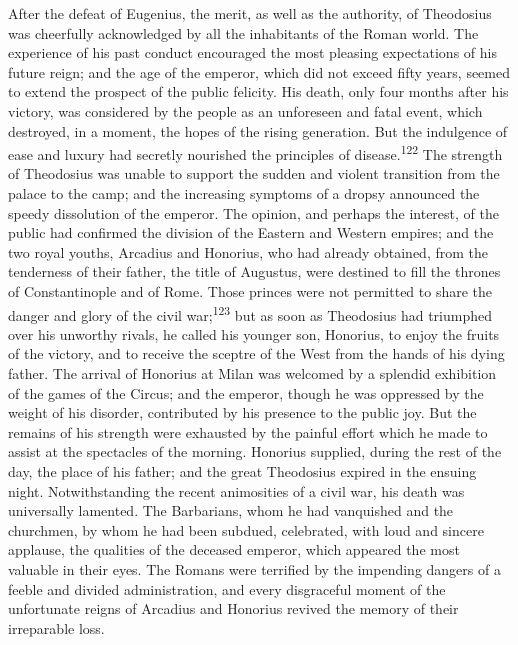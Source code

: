 
After the defeat of Eugenius, the merit, as well as the
authority, of Theodosius was cheerfully acknowledged by all the
inhabitants of the Roman world. The experience of his past
conduct encouraged the most pleasing expectations of his future
reign; and the age of the emperor, which did not exceed fifty
years, seemed to extend the prospect of the public felicity. His
death, only four months after his victory, was considered by the
people as an unforeseen and fatal event, which destroyed, in a
moment, the hopes of the rising generation. But the indulgence of
ease and luxury had secretly nourished the principles of disease.\textsuperscript{122}
The strength of Theodosius was unable to support the sudden
and violent transition from the palace to the camp; and the
increasing symptoms of a dropsy announced the speedy dissolution
of the emperor. The opinion, and perhaps the interest, of the
public had confirmed the division of the Eastern and Western
empires; and the two royal youths, Arcadius and Honorius, who had
already obtained, from the tenderness of their father, the title
of Augustus, were destined to fill the thrones of Constantinople
and of Rome. Those princes were not permitted to share the danger
and glory of the civil war;\textsuperscript{123} but as soon as Theodosius had
triumphed over his unworthy rivals, he called his younger son,
Honorius, to enjoy the fruits of the victory, and to receive the
sceptre of the West from the hands of his dying father. The
arrival of Honorius at Milan was welcomed by a splendid
exhibition of the games of the Circus; and the emperor, though he
was oppressed by the weight of his disorder, contributed by his
presence to the public joy. But the remains of his strength were
exhausted by the painful effort which he made to assist at the
spectacles of the morning. Honorius supplied, during the rest of
the day, the place of his father; and the great Theodosius
expired in the ensuing night. Notwithstanding the recent
animosities of a civil war, his death was universally lamented.
The Barbarians, whom he had vanquished and the churchmen, by whom
he had been subdued, celebrated, with loud and sincere applause,
the qualities of the deceased emperor, which appeared the most
valuable in their eyes. The Romans were terrified by the
impending dangers of a feeble and divided administration, and
every disgraceful moment of the unfortunate reigns of Arcadius
and Honorius revived the memory of their irreparable loss.

